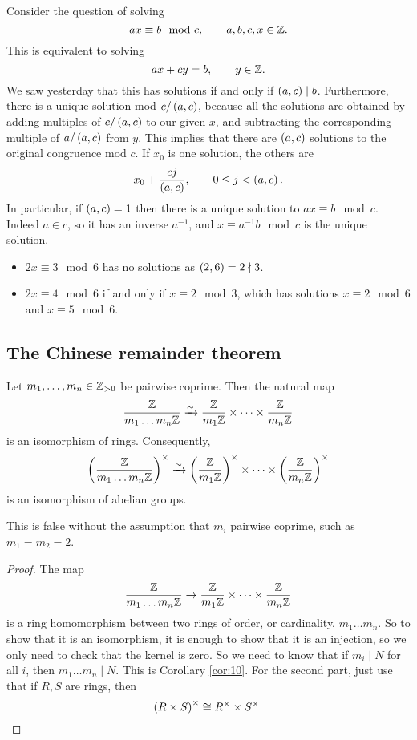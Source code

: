 
Consider the question of solving
$$ ax \equiv b \mod c, \qquad a, b, c, x \in \mathbb{Z}. $$
This is equivalent to solving
$$ ax + cy = b, \qquad y \in \mathbb{Z}. $$
We saw yesterday that this has solutions if and only if $ \br{a, c} \mid b $. Furthermore, there is a unique solution mod $ c / \br{a, c} $, because all the solutions are obtained by adding multiples of $ c / \br{a, c} $ to our given $ x $, and subtracting the corresponding multiple of $ a / \br{a, c} $ from $ y $. This implies that there are $ \br{a, c} $ solutions to the original congruence mod $ c $. If $ x_0 $ is one solution, the others are
$$ x_0 + \dfrac{cj}{\br{a, c}}, \qquad 0 \le j < \br{a, c}. $$
In particular, if $ \br{a, c} = 1 $ then there is a unique solution to $ ax \equiv b \mod c $. Indeed $ a \in \unit{c} $, so it has an inverse $ a^{-1} $, and $ x \equiv a^{-1}b \mod c $ is the unique solution.

\begin{example*}
\hfill
\begin{itemize}
\item $ 2x \equiv 3 \mod 6 $ has no solutions as $ \br{2, 6} = 2 \nmid 3 $.
\item $ 2x \equiv 4 \mod 6 $ if and only if $ x \equiv 2 \mod 3 $, which has solutions $ x \equiv 2 \mod 6 $ and $ x \equiv 5 \mod 6 $.
\end{itemize}
\end{example*}

\subsection{The Chinese remainder theorem}

\begin{theorem}
\label{thm:14}
Let $ m_1, \dots, m_n \in \mathbb{Z}_{> 0} $ be pairwise coprime. Then the natural map
$$ \dfrac{\mathbb{Z}}{m_1 \dots m_n\mathbb{Z}} \xrightarrow{\sim} \dfrac{\mathbb{Z}}{m_1\mathbb{Z}} \times \dots \times \dfrac{\mathbb{Z}}{m_n\mathbb{Z}} $$
is an isomorphism of rings. Consequently,
$$ \Unit{m_1 \dots m_n} \xrightarrow{\sim} \Unit{m_1} \times \dots \times \Unit{m_n} $$
is an isomorphism of abelian groups.
\end{theorem}

\begin{remark*}
This is false without the assumption that $ m_i $ pairwise coprime, such as $ m_1 = m_2 = 2 $.
\end{remark*}

\begin{proof}
The map
$$ \dfrac{\mathbb{Z}}{m_1 \dots m_n\mathbb{Z}} \to \dfrac{\mathbb{Z}}{m_1\mathbb{Z}} \times \dots \times \dfrac{\mathbb{Z}}{m_n\mathbb{Z}} $$
is a ring homomorphism between two rings of order, or cardinality, $ m_1 \dots m_n $. So to show that it is an isomorphism, it is enough to show that it is an injection, so we only need to check that the kernel is zero. So we need to know that if $ m_i \mid N $ for all $ i $, then $ m_1 \dots m_n \mid N $. This is Corollary \ref{cor:10}. For the second part, just use that if $ R, S $ are rings, then
$$ \br{R \times S}^\times \cong R^\times \times S^\times. $$
\end{proof}

